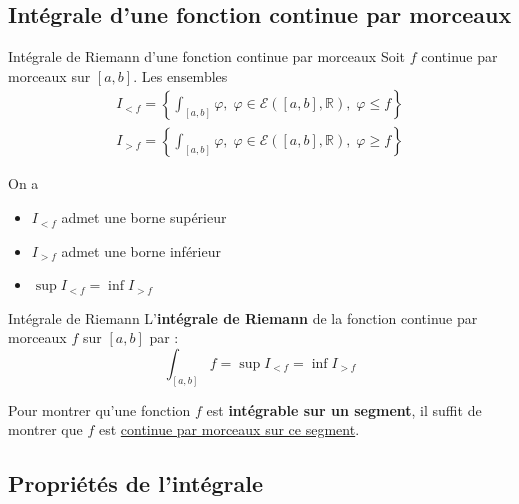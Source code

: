 \subsection{Intégrale d'une fonction continue par morceaux} %
\label{sub:Intégrale d'une fonction continue par morceaux}

\begin{Prop}{Intégrale de Riemann d'une fonction continue par morceaux}{}
  Soit $f$ continue par morceaux sur $[a,b]$. Les ensembles 
\begin{gather}
  I _{<f} = \left\{ \int _{[a,b]} \varphi,\; \varphi \in \mathcal{E}([a,b],\mathbb{R}), \; \varphi \le f\right\} \\
  I _{>f} = \left\{ \int _{[a,b]} \varphi,\; \varphi \in \mathcal{E}([a,b],\mathbb{R}), \; \varphi \ge f\right\}
\end{gather}

On a 
\begin{itemize}

    \item $I _{<f}$ admet une borne supérieur
    \item $I _{>f}$ admet une borne inférieur
    \item $\sup I _{<f} = \inf I _{>f}$
    

\end{itemize}


\end{Prop}

\begin{Definition}[colbacktitle=red!75!black]{Intégrale de Riemann}{}
  L'\textbf{intégrale de Riemann} de la fonction continue par morceaux $f$ sur $[a,b]$ par : 
  \begin{equation}
    \int _{[a,b]} f = \sup I _{<f} = \inf I _{>f}
  \end{equation}

\end{Definition}


\begin{note}{}{}
Pour montrer qu'une fonction $f$ est \textbf{intégrable sur un segment}, il suffit de montrer que $f$ est \underline{continue par morceaux sur ce segment}.
\end{note}

\subsection{Propriétés de l'intégrale} %
\label{sub:Propriétés de l'intégrale}

